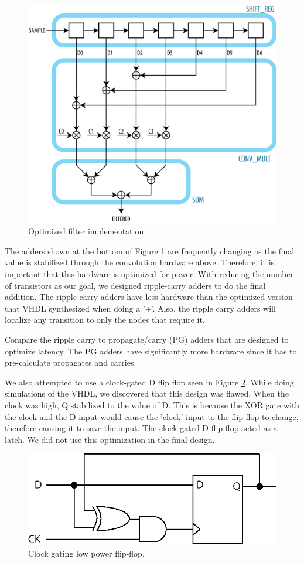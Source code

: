 \begin{figure}[ht]
\centering
\includegraphics[width=5in]{images/filter_filtered}
\caption{Optimized filter implementation}
\label{fig:optimizedfilter}
\end{figure}

The adders shown at the bottom of Figure \ref{fig:optimizedfilter} are frequently changing as the final value is stabilized through the convolution hardware above.  Therefore, it is important that this hardware is optimized for power.  With reducing the number of transistors as our goal, we designed ripple-carry adders to do the final addition.  The ripple-carry adders have less hardware than the optimized version that VHDL synthesized when doing a '+'.  Also, the ripple carry adders will localize any transition to only the nodes that require it.

Compare the ripple carry to propagate/carry (PG) adders that are designed to optimize latency.  The PG adders have significantly more hardware since it has to pre-calculate propagates and carries.  

We also attempted to use a clock-gated D flip flop seen in Figure \ref{fig:gateclocked}.  While doing simulations of the VHDL, we discovered that this design was flawed.  When the clock was high, Q stabilized to the value of D.  This is because the XOR gate with the clock and the D input would cause the 'clock' input to the flip flop to change, therefore causing it to save the input.  The clock-gated D flip-flop acted as a latch.  We did not use this optimization in the final design.


\begin{figure}[ht]
\centering
\includegraphics[width=5in]{images/clockgating}
\caption{Clock gating low power flip-flop.}
\label{fig:gateclocked}
\end{figure}



